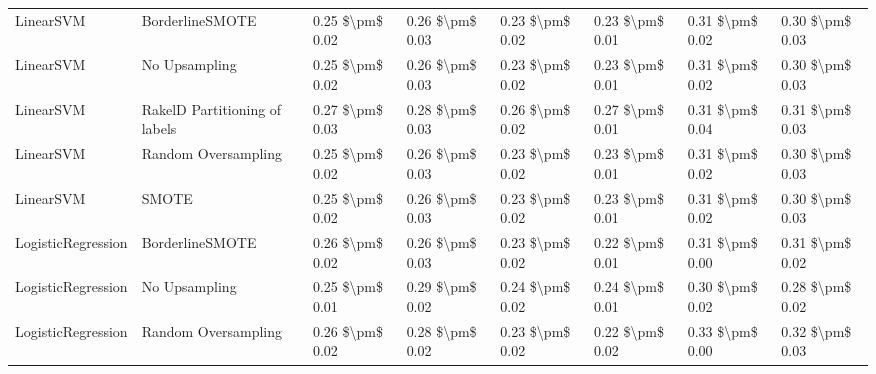 \begin{tabular}{llllllll}
                      LinearSVM &               BorderlineSMOTE & 0.25 \$\textbackslash pm\$ 0.02 &           0.26 \$\textbackslash pm\$ 0.03 &       0.23 \$\textbackslash pm\$ 0.02 &        0.23 \$\textbackslash pm\$ 0.01 &                         0.31 \$\textbackslash pm\$ 0.02 &     0.30 \$\textbackslash pm\$ 0.03 \\
                      LinearSVM &                 No Upsampling & 0.25 \$\textbackslash pm\$ 0.02 &           0.26 \$\textbackslash pm\$ 0.03 &       0.23 \$\textbackslash pm\$ 0.02 &        0.23 \$\textbackslash pm\$ 0.01 &                         0.31 \$\textbackslash pm\$ 0.02 &     0.30 \$\textbackslash pm\$ 0.03 \\
                      LinearSVM & RakelD Partitioning of labels & 0.27 \$\textbackslash pm\$ 0.03 &           0.28 \$\textbackslash pm\$ 0.03 &       0.26 \$\textbackslash pm\$ 0.02 &        0.27 \$\textbackslash pm\$ 0.01 &                         0.31 \$\textbackslash pm\$ 0.04 &     0.31 \$\textbackslash pm\$ 0.03 \\
                      LinearSVM &           Random Oversampling & 0.25 \$\textbackslash pm\$ 0.02 &           0.26 \$\textbackslash pm\$ 0.03 &       0.23 \$\textbackslash pm\$ 0.02 &        0.23 \$\textbackslash pm\$ 0.01 &                         0.31 \$\textbackslash pm\$ 0.02 &     0.30 \$\textbackslash pm\$ 0.03 \\
                      LinearSVM &                         SMOTE & 0.25 \$\textbackslash pm\$ 0.02 &           0.26 \$\textbackslash pm\$ 0.03 &       0.23 \$\textbackslash pm\$ 0.02 &        0.23 \$\textbackslash pm\$ 0.01 &                         0.31 \$\textbackslash pm\$ 0.02 &     0.30 \$\textbackslash pm\$ 0.03 \\
             LogisticRegression &               BorderlineSMOTE & 0.26 \$\textbackslash pm\$ 0.02 &           0.26 \$\textbackslash pm\$ 0.03 &       0.23 \$\textbackslash pm\$ 0.02 &        0.22 \$\textbackslash pm\$ 0.01 &                         0.31 \$\textbackslash pm\$ 0.00 &     0.31 \$\textbackslash pm\$ 0.02 \\
             LogisticRegression &                 No Upsampling & 0.25 \$\textbackslash pm\$ 0.01 &           0.29 \$\textbackslash pm\$ 0.02 &       0.24 \$\textbackslash pm\$ 0.02 &        0.24 \$\textbackslash pm\$ 0.01 &                         0.30 \$\textbackslash pm\$ 0.02 &     0.28 \$\textbackslash pm\$ 0.02 \\
             LogisticRegression &           Random Oversampling & 0.26 \$\textbackslash pm\$ 0.02 &           0.28 \$\textbackslash pm\$ 0.02 &       0.23 \$\textbackslash pm\$ 0.02 &        0.22 \$\textbackslash pm\$ 0.02 &                         0.33 \$\textbackslash pm\$ 0.00 &     0.32 \$\textbackslash pm\$ 0.03 \\

\end{tabular}
